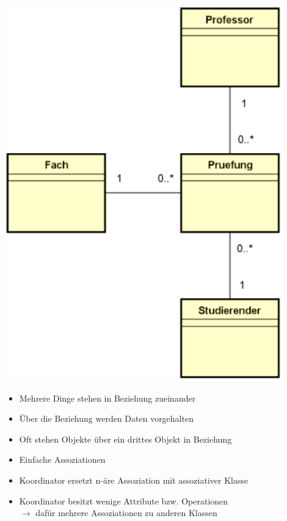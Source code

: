 \documentclass[11pt, a4paper]{article}
\begin{document}
\begin{minipage}[h]{0.25\textwidth}
    \centering \includegraphics[width=0.9\textwidth]{Analysemuster-04.png} 
\end{minipage}
\begin{minipage}[h]{0.7\textwidth}
    \raggedleft
    \begin{itemize}
        \item Mehrere Dinge stehen in Beziehung zueinander
        \item Über die Beziehung werden Daten vorgehalten
        \item Oft stehen Objekte über ein drittes Objekt in Beziehung
    \end{itemize}
    \vspace{1em}
    \begin{itemize}
        \item Einfache Assoziationen
        \item Koordinator ersetzt n-äre Assoziation mit assoziativer Klasse
        \item Koordinator besitzt wenige Attribute bzw. Operationen \\ \tiny $\rightarrow $ dafür mehrere Assoziationen zu anderen Klassen
    \end{itemize}
\end{minipage}
\end{document}
